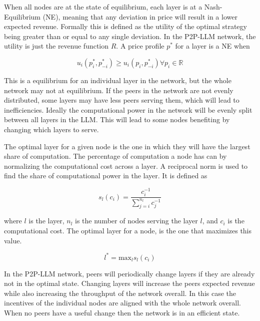 \documentclass[preprint,twoside,11pt]{article}
\begin{document}
When all nodes are at the state of equilibrium, each layer is at a Nash-Equilibrium (NE), meaning that any deviation in price
will result in a lower expected revenue. Formally this is defined as the utility of the optimal strategy being greater than or equal to any single deviation.
In the P2P-LLM network, the utility is just the revenue function $R$.
A price profile $p^*$ for a layer is a NE when

\begin{equation}
	u_i(p_i^*, p^*_{-i}) \geq u_i(p_i, p^*_{-i}) \forall p_i \in \mathbb{R}
\end{equation}

This is a equilibrium for an individual layer in the network, but the whole network may
not at equilibrium. If the peers in the network are not evenly distributed,
some layers may have less peers serving them, which will lead to inefficiencies.
Ideally the computational power in the network will be evenly split between all layers
in the LLM. This will lead to some nodes benefiting by changing which layers to serve.

The optimal layer for a given node is the one in which they will have the largest
share of computation. The percentage of computation a node has can by normalizing the
computational cost across a layer. A reciprocal norm is used to find the share of computational power in the layer.
It is defined as

\begin{equation}
	s_l(c_i) = \frac{c_i^{-1}}{\sum_{j=i}^{n_l}c_j^{-1}}
	\label{eq:norm}
\end{equation}

where $l$ is the layer, $n_l$ is the number of nodes serving the layer $l$, and $c_i$ is the computational cost.
The optimal layer for a node, is the one that maximizes this value.

\begin{equation}
	l^* = \text{max}_l s_l(c_i)
	\label{eq:max}
\end{equation}

In the P2P-LLM network, peers will periodically change layers if they are already not in the optimal state.
Changing layers will increase the peers expected revenue while also increasing the throughput of the network overall.
In this case the incentives of the individual nodes are aligned with the whole network overall.
When no peers have a useful change then the network is in an efficient state.
\end{document}
